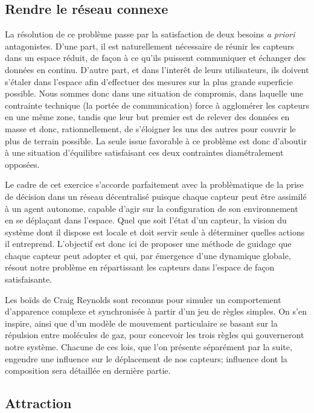 \documentclass[10pt]{article}
\begin{document}
\begin{multicols}{2}
\section{Rendre le réseau connexe}

La résolution de ce problème passe par la satisfaction de deux besoins
\textit{a priori} antagonistes. D'une part, il est naturellement
nécessaire de réunir les capteurs dans un espace réduit, de façon à ce
qu'ils puissent communiquer et échanger des données en
continu. D'autre part, et dans l'interêt de leurs utilisateurs, ils
doivent s'étaler dans l'espace afin d'effectuer des mesures sur la
plus grande superficie possible. Nous sommes donc dans une situation
de compromis, dans laquelle une contrainte technique (la portée de
communication) force à agglomérer les capteurs en une même zone,
tandis que leur but premier est de relever des données en masse et
donc, rationnellement, de s'éloigner les uns des autres pour couvrir
le plus de terrain possible. La seule issue favorable à ce problème
est donc d'aboutir à une situation d'équilibre satisfaisant ces deux
contraintes diamétralement opposées.

Le cadre de cet exercice s'accorde parfaitement avec la problèmatique
de la prise de décision dans un réseau décentralisé puisque chaque
capteur peut être assimilé à un agent autonome, capable d'agir sur la
configuration de son environnement en se déplaçant dans l'espace. Quel
que soit l'état d'un capteur, la vision du système dont il dispose est
locale et doit servir seule à déterminer quelles actions il
entreprend. L'objectif est donc ici de proposer une méthode de guidage
que chaque capteur peut adopter et qui, par émergence d'une dynamique
globale, résout notre problème en répartissant les capteurs dans
l'espace de façon satisfaisante.

Les boïds de Craig Reynolds \cite{Reynolds1987} sont reconnus pour
simuler un comportement d'apparence complexe et synchronisée à partir
d'un jeu de règles simples. On s'en inspire, ainsi que d'un modèle de
mouvement particulaire \cite{Cheng2011497} se basant sur la répulsion
entre molécules de gaz, pour concevoir les trois règles qui
gouverneront notre système. Chacune de ces lois, que l'on présente
séparément par la suite, engendre une influence sur le déplacement de
nos capteurs; influence dont la composition sera détaillée en dernière
partie.

\subsection*{Attraction}


\end{multicols}
\end{document}

